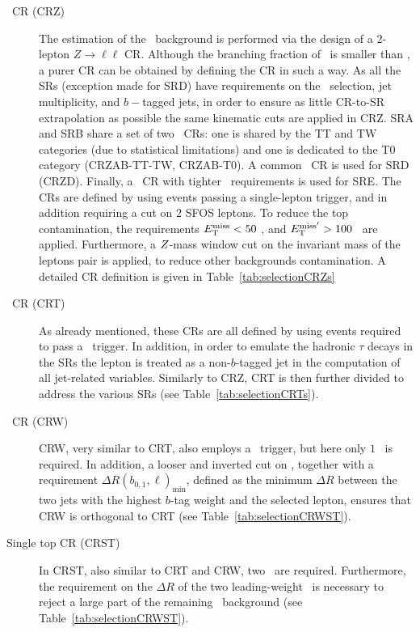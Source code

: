 			\begin{description}

				\item [\Zjets\ CR (CRZ)] The estimation of the \Znunu\ background is performed via the design of a $2$-lepton $Z \rightarrow \ell \ell$ \ac{CR}. Although the branching fraction of \Zll\ is smaller than \Znunu, a purer \ac{CR} can be obtained by defining the \ac{CR} in such a way. As all the \acp{SR} (exception made for SRD) have requirements on the \MET\ selection, jet multiplicity, and $b-$tagged jets, in order to ensure as little \ac{CR}-to-\ac{SR} extrapolation as possible the same kinematic cuts are applied in CRZ. SRA and SRB share a set of two \Zboson\ \acp{CR}: one is shared by the TT and TW categories (due to statistical limitations) and one is dedicated to the T0 category (CRZAB-TT-TW, CRZAB-T0). A common \Zboson\ \ac{CR} is used for SRD (CRZD). Finally, a \Zboson\ \ac{CR} with tighter \HT\ requirements is used for SRE. The \acp{CR} are defined by using events passing a single-lepton trigger, and in addition requiring a cut on $2$ \acl{SFOS} leptons. To reduce the top contamination, the requirements $E_{\mathrm{T}}^{\mathrm{miss}} < 50$ \GeV, and  $E_{\mathrm{T}}^{\mathrm{miss'}} > 100$ \GeV\ are applied. Furthermore, a $Z$-mass window cut on the invariant mass of the leptons pair is applied, to reduce other backgrounds contamination. A detailed \ac{CR} definition is given in Table~\ref{tab:selectionCRZs}

		
				\item [\ttbar\ CR (CRT)] As already mentioned, these \acp{CR} are all defined by using events required to pass a \met\ trigger. In addition, in order to emulate the hadronic $\tau$ decays in the \acp{SR} the lepton is treated as a non-$b$-tagged jet in the computation of all jet-related variables. Similarly to CRZ, CRT is then further divided to address the various \acp{SR} (see Table~\ref{tab:selectionCRTs}).

				\item [\Wjets\ CR (CRW)] CRW, very similar to CRT, also employs a \met\ trigger, but here only $1$ \bj\ is required. In addition, a looser and inverted cut on \mantikttwelvezero, together with a requirement $\Delta R(b_{0,1},\ell)_{\mathrm{min}}$, defined as the minimum $\Delta R$ between the two jets with the highest $b$-tag weight and the selected lepton, ensures that CRW is orthogonal to CRT (see Table~\ref{tab:selectionCRWST}). 

				\item [Single top CR (CRST)] In CRST, also similar to CRT and CRW, two \bjs\ are required. Furthermore, the requirement on the $\Delta R$ of the two leading-weight \bjs\ is necessary to reject a large part of the remaining \ttbar\ background (see Table~\ref{tab:selectionCRWST}).
			\end{description}

